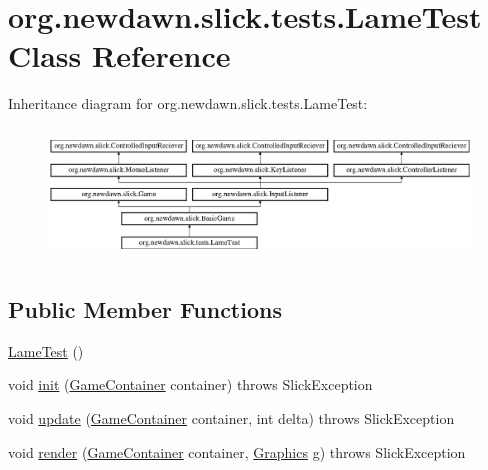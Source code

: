 \hypertarget{classorg_1_1newdawn_1_1slick_1_1tests_1_1_lame_test}{}\section{org.\+newdawn.\+slick.\+tests.\+Lame\+Test Class Reference}
\label{classorg_1_1newdawn_1_1slick_1_1tests_1_1_lame_test}
Inheritance diagram for org.\+newdawn.\+slick.\+tests.\+Lame\+Test\+:\begin{figure}[H]
\begin{center}
\leavevmode
\includegraphics[height=3.522012cm]{classorg_1_1newdawn_1_1slick_1_1tests_1_1_lame_test}
\end{center}
\end{figure}
\subsection*{Public Member Functions}
\begin{DoxyCompactItemize}
\item 
\mbox{\hyperlink{classorg_1_1newdawn_1_1slick_1_1tests_1_1_lame_test_a8a3bf60ab7c2229e1e5f062f619e8706}{Lame\+Test}} ()
\item 
void \mbox{\hyperlink{classorg_1_1newdawn_1_1slick_1_1tests_1_1_lame_test_a0c30b1934e4bb18b4e3d228f159a37ff}{init}} (\mbox{\hyperlink{classorg_1_1newdawn_1_1slick_1_1_game_container}{Game\+Container}} container)  throws Slick\+Exception 
\item 
void \mbox{\hyperlink{classorg_1_1newdawn_1_1slick_1_1tests_1_1_lame_test_a05a4fafc189bb19b18d3238b308ca933}{update}} (\mbox{\hyperlink{classorg_1_1newdawn_1_1slick_1_1_game_container}{Game\+Container}} container, int delta)  throws Slick\+Exception 
\item 
void \mbox{\hyperlink{classorg_1_1newdawn_1_1slick_1_1tests_1_1_lame_test_a05d29176a7cfc7088c18d1966d0d67b2}{render}} (\mbox{\hyperlink{classorg_1_1newdawn_1_1slick_1_1_game_container}{Game\+Container}} container, \mbox{\hyperlink{classorg_1_1newdawn_1_1slick_1_1_graphics}{Graphics}} g)  throws Slick\+Exception 
\end{DoxyCompactItemize}
